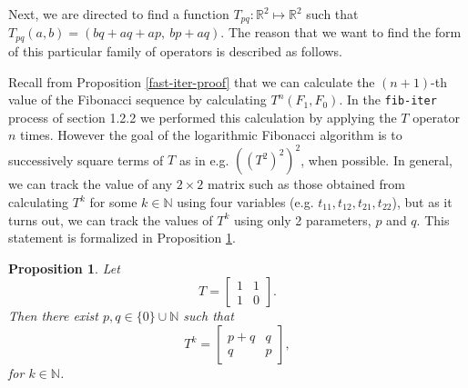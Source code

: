 \documentclass{article}
\newtheorem{proposition}{Proposition}
\begin{document}
\vspace{5mm}





\noindent Next, we are directed to find a function
$T_{pq}: \mathbb{R}^2 \mapsto \mathbb{R}^2$ such that
$T_{pq}(a, b) = (bq + aq + ap,~ bp + aq)$.  The reason that we want to find the
form of this particular family of operators is described as follows.

Recall from Proposition \ref{fast-iter-proof} that we can calculate the
$(n + 1)$-th value of the Fibonacci sequence by calculating $T^n (F_1, F_0)$.
In the \lstinline{fib-iter} process of section 1.2.2 we performed this
calculation by applying the $T$ operator $n$ times.  However the goal of the
logarithmic Fibonacci algorithm is to successively square terms of $T$ as in
e.g.  $((T^2)^2)^2$, when possible.  In general, we can track the value of any
$2 \times 2$ matrix such as those obtained from calculating $T^k$ for some
$k \in \mathbb{N}$ using four variables (e.g. $t_{11}, t_{12}, t_{21}, t_{22}$),
but as it turns out, we can track the values of $T^k$ using only 2 parameters,
$p$ and $q$.  This statement is formalized in Proposition
\ref{thm:parameterize-power-t}.


\vspace{10mm}
\begin{proposition}
  \label{thm:parameterize-power-t}
  Let
  \begin{equation*}
    T =
    \begin{bmatrix}
      1 & 1 \\
      1 & 0
    \end{bmatrix}.
  \end{equation*}
  Then there exist $p, q \in \{0\} \cup \mathbb{N}$ such that
  \begin{equation*}
    T^k =
    \begin{bmatrix}
      p + q & q \\
      q     & p
    \end{bmatrix},
  \end{equation*}
  for $k \in \mathbb{N}$.
\end{proposition}
\end{document}
